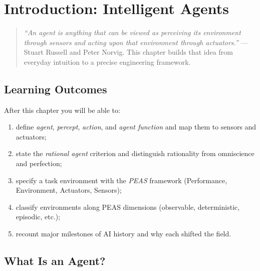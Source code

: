 \chapter{Introduction: Intelligent Agents}
\label{ch:intro}

\begin{quote}
\emph{``An agent is anything that can be viewed as perceiving its environment through sensors and acting upon that environment through actuators.''} --- Stuart Russell and Peter Norvig. This chapter builds that idea from everyday intuition to a precise engineering framework.
\end{quote}

\noindent{}
\vspace{0.4em}

\section*{Learning Outcomes}
After this chapter you will be able to:
\begin{enumerate}[label=(L\arabic*)]
    \item define \emph{agent}, \emph{percept}, \emph{action}, and \emph{agent function} and map them to sensors and actuators;
    \item state the \emph{rational agent} criterion and distinguish rationality from omniscience and perfection;
    \item specify a task environment with the \emph{PEAS} framework (Performance, Environment, Actuators, Sensors);
    \item classify environments along PEAS dimensions (observable, deterministic, episodic, etc.);
    \item recount major milestones of AI history and why each shifted the field.
\end{enumerate}

\section{What Is an Agent?}
\label{sec:what-is-agent}
